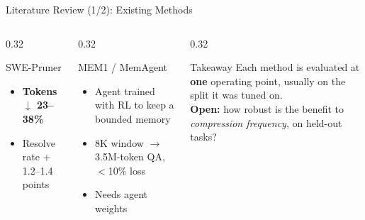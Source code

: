 \documentclass[aspectratio=169,10pt]{beamer}
\begin{document}
\begin{frame}{Literature Review (1/2): Existing Methods}
\begin{columns}[T]
\begin{column}{0.32\textwidth}
\begin{block}{SWE-Pruner \cite{SWEPruner}}
\begin{itemize}
  \item \textbf{Tokens $\downarrow$ 23--38\%}
  \item Resolve rate $+$1.2--1.4 points
\end{itemize}
\end{block}
\end{column}
\begin{column}{0.32\textwidth}
\begin{block}{MEM1 / MemAgent \cite{MEM1,MemAgent}}
\footnotesize
\begin{itemize}
  \item Agent trained with RL to keep a bounded memory
  \item 8K window $\to$ 3.5M-token QA, $<$10\% loss
  \item \textcolor{red!70!black}{Needs agent weights}
\end{itemize}
\end{block}
\end{column}
\begin{column}{0.32\textwidth}
\begin{alertblock}{Takeaway}
\footnotesize
Each method is evaluated at \textbf{one} operating point, usually on the
split it was tuned on.\\[2pt]
\textbf{Open:} how robust is the benefit to \emph{compression frequency}, on
held-out tasks?
\end{alertblock}
\end{column}
\end{columns}
\end{frame}
\end{document}
